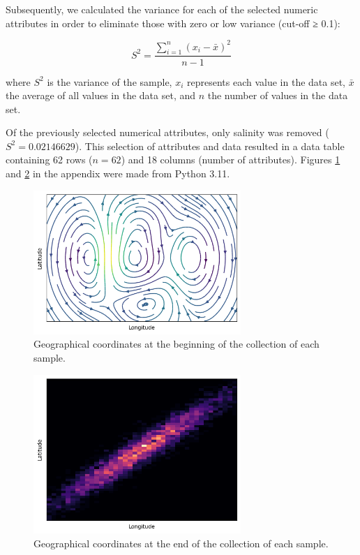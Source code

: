 Subsequently, we calculated the variance for each of the selected numeric attributes in order to eliminate those with zero or low variance (cut-off ≥ 0.1):

\begin{equation}
S^2 = \frac{\sum_{i=1}^{n} (x_i - \bar{x})^2}{n-1}
\end{equation}

where \( S^2 \) is the variance of the sample, \( x_i \) represents each value in the data set, \( \bar{x} \) the average of all values in the data set, and \( n \) the number of values in the data set.

Of the previously selected numerical attributes, only salinity was removed (\( S^2 = 0.02146629 \)). This selection of attributes and data resulted in a data table containing 62 rows (\( n=62 \)) and 18 columns (number of attributes). Figures \ref{fig:fig1a} and \ref{fig:fig1b} in the appendix were made from Python 3.11.

\begin{figure}[]
    \centering
    \includegraphics[width=0.7\textwidth]{figure1.png}
    \caption{Geographical coordinates at the beginning of the collection of each sample. \label{fig:fig1a}}
\end{figure}

\begin{figure}[]
    \centering
    \includegraphics[width=0.7\textwidth]{figure2.png}
    \caption{Geographical coordinates at the end of the collection of each sample. \label{fig:fig1b}}
\end{figure}

